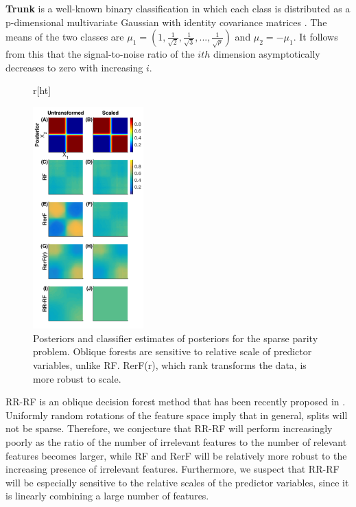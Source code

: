 \textbf{Trunk} is a well-known binary classification in which each class is distributed as a p-dimensional multivariate Gaussian with identity covariance matrices \cite{Trunk1979}. The means of the two classes are $\mu_1 = (1,\frac{1}{\sqrt{2}},\frac{1}{\sqrt{3}},...,\frac{1}{\sqrt{p}})$ and $\mu_2 = -\mu_1$. It follows from this that the signal-to-noise ratio of the $ith$ dimension asymptotically decreases to zero with increasing $i$.

\begin{figure}{r}[ht]
\begin{center}
\includegraphics[width=0.38\textwidth] {Fig1_posteriors}
\caption{Posteriors and classifier estimates of posteriors for the sparse parity problem. Oblique forests are sensitive to relative scale of predictor variables, unlike RF. RerF(r), which rank transforms the data, is more robust to scale.}
\label{posteriors}
\end{center}
\end{figure}

RR-RF is an oblique decision forest method that has been recently proposed in \cite{Blaser2016}. Uniformly random rotations of the feature space imply that in general, splits will not be sparse. Therefore, we conjecture that RR-RF will perform increasingly poorly as the ratio of the number of irrelevant features to the number of relevant features becomes larger, while RF and RerF will be relatively more robust to the increasing presence of irrelevant features. Furthermore, we suspect that RR-RF will be especially sensitive to the relative scales of the predictor variables, since it is linearly combining a large number of features.

